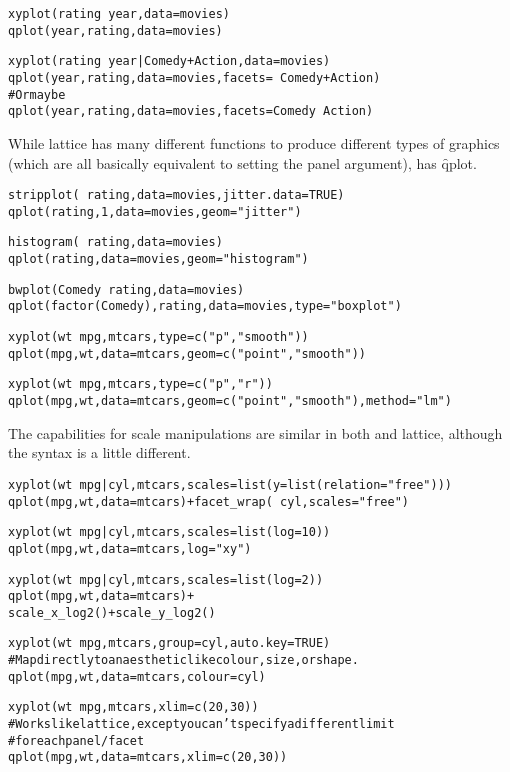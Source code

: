 \begin{alltt}
xyplot(rating ~ year, data=movies)
qplot(year, rating, data=movies)

xyplot(rating ~ year | Comedy + Action, data = movies)
qplot(year, rating, data = movies, facets = ~ Comedy + Action)
# Or maybe
qplot(year, rating, data = movies, facets = Comedy ~ Action)
\end{alltt}

While lattice has many different functions to produce different types of graphics (which are all basically equivalent to setting the panel argument), \ggplot has \f{qplot}.

\begin{alltt}
stripplot(~ rating, data = movies, jitter.data = TRUE)
qplot(rating, 1, data = movies, geom = "jitter")

histogram(~ rating, data = movies)
qplot(rating, data = movies, geom = "histogram")

bwplot(Comedy ~ rating ,data = movies)
qplot(factor(Comedy), rating, data = movies, type = "boxplot")

xyplot(wt ~ mpg, mtcars, type = c("p","smooth"))
qplot(mpg, wt, data = mtcars, geom = c("point","smooth"))

xyplot(wt ~ mpg, mtcars, type = c("p","r"))
qplot(mpg, wt, data = mtcars, geom = c("point","smooth"), method = "lm")
\end{alltt}

The capabilities for scale manipulations are similar in both \ggplot and lattice, although the syntax is a little different.

\begin{alltt}
xyplot(wt ~ mpg | cyl, mtcars, scales = list(y = list(relation = "free")))
qplot(mpg, wt, data = mtcars) + facet_wrap(~ cyl, scales = "free")

xyplot(wt ~ mpg | cyl, mtcars, scales = list(log = 10))
qplot(mpg, wt, data = mtcars, log = "xy") 

xyplot(wt ~ mpg | cyl, mtcars, scales = list(log = 2))
qplot(mpg, wt, data = mtcars) + 
  scale_x_log2() + scale_y_log2()

xyplot(wt ~ mpg, mtcars, group = cyl, auto.key = TRUE)
# Map directly to an aesthetic like colour, size, or shape.
qplot(mpg, wt, data = mtcars, colour = cyl)

xyplot(wt ~ mpg, mtcars, xlim = c(20,30))
# Works like lattice, except you can't specify a different limit 
# for each panel/facet
qplot(mpg, wt, data = mtcars, xlim = c(20,30))
\end{alltt}

